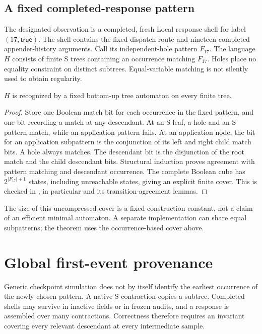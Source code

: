 \subsection{A fixed completed-response pattern}
The designated observation is a completed, fresh Local response shell for
label $(17,\mathsf{true})$. The shell contains the fixed dispatch route and
nineteen completed appender-history arguments. Call its independent-hole
pattern $F_{17}$. The language $H$ consists of finite S trees containing an
occurrence matching $F_{17}$. Holes place no equality constraint on distinct
subtrees. Equal-variable matching is not silently used to obtain regularity.

\begin{lemma}\label{lem:regular}
$H$ is recognized by a fixed bottom-up tree automaton on every finite tree.
\end{lemma}
\begin{proof}
Store one Boolean match bit for each occurrence in the fixed pattern, and one
bit recording a match at any descendant. At an S leaf, a hole and an S pattern
match, while an application pattern fails. At an application node, the bit
for an application subpattern is the conjunction of its left and right child
match bits. A hole always matches. The descendant bit is the disjunction of
the root match and the child descendant bits. Structural induction proves
agreement with pattern matching and descendant occurrence. The complete
Boolean cube has $2^{|F_{17}|+1}$ states, including unreachable states, giving
an explicit finite cover. This is checked in , in particular
 and its transition-agreement lemmas.
\end{proof}

The size of this uncompressed cover is a fixed construction constant, not a
claim of an efficient minimal automaton. A separate implementation can share
equal subpatterns; the theorem uses the occurrence-based cover above.

\section{Global first-event provenance}\label{sec:first}

Generic checkpoint simulation does not by itself identify the earliest
occurrence of the newly chosen pattern. A native S contraction copies a
subtree. Completed shells may survive in inactive fields or in frozen audits,
and a response is assembled over many contractions. Correctness therefore
requires an invariant covering every relevant descendant at every intermediate
sample.

